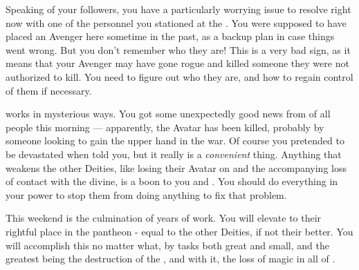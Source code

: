 \documentclass[char]{GL2020}
\begin{document}
Speaking of your followers, you have a particularly worrying issue to resolve right now with one of the personnel you stationed at the \pSc{}. You were supposed to have placed an Avenger here sometime in the past, as a backup plan in case things went wrong. But you don't remember who they are! This is a very bad sign, as it means that your Avenger may have gone rogue and killed someone they were not authorized to kill. You need to figure out who they are, and how to regain control of them if necessary.

\cGenesis{} works in mysterious ways. You got some unexpectedly good news from \cEbbPriest{} of all people this morning — apparently, the \cEbb{} Avatar has been killed, probably by someone looking to gain the upper hand in the war. Of course you pretended to be devastated when \cEbbPriest{\they} told you, but it really is a \emph{convenient} thing. Anything that weakens the other Deities, like losing their Avatar on \pEarth{} and the accompanying loss of contact with the divine, is a boon to you and \cGenesis{}. You should do everything in your power to stop them from doing anything to fix that problem.

This weekend is the culmination of years of work. You will elevate \cGenesis{} to their rightful place in the pantheon - equal to the other Deities, if not their better. You will accomplish this no matter what, by tasks both great and small, and the greatest being the destruction of the \pSchool{}, and with it, the loss of magic in all of \pEarth{}.
\end{document}
